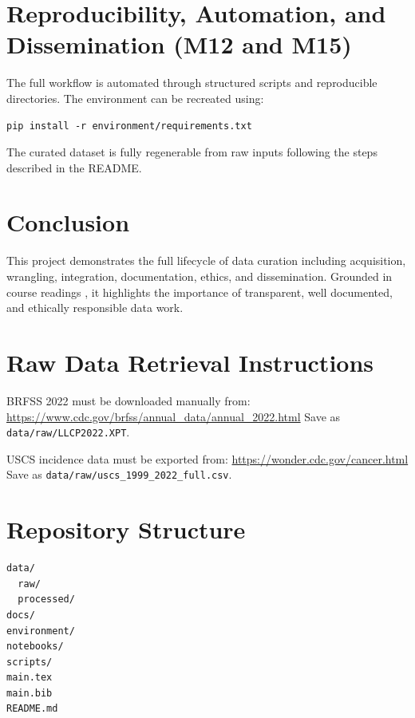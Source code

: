 \documentclass[12pt]{article}
\begin{document}
\section{Reproducibility, Automation, and Dissemination (M12 and M15)}

The full workflow is automated through structured scripts and reproducible directories. The environment can be recreated using:

\begin{verbatim}
pip install -r environment/requirements.txt
\end{verbatim}

The curated dataset is fully regenerable from raw inputs following the steps described in the README.

\section{Conclusion}

This project demonstrates the full lifecycle of data curation including acquisition, wrangling, integration, documentation, ethics, and dissemination. Grounded in course readings \parencite{bailey2012, hanson2012, plale2017, terrizzano2015}, it highlights the importance of transparent, well documented, and ethically responsible data work.

\printbibliography


\appendix

\section{Raw Data Retrieval Instructions}

BRFSS 2022 must be downloaded manually from:  
\url{https://www.cdc.gov/brfss/annual_data/annual_2022.html}  
Save as \texttt{data/raw/LLCP2022.XPT}.

USCS incidence data must be exported from:  
\url{https://wonder.cdc.gov/cancer.html}  
Save as \texttt{data/raw/uscs\_1999\_2022\_full.csv}.

\section{Repository Structure}

\begin{verbatim}
data/
  raw/
  processed/
docs/
environment/
notebooks/
scripts/
main.tex
main.bib
README.md
\end{verbatim}
\end{document}
